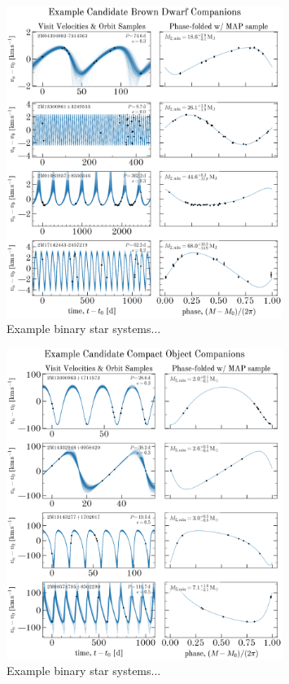 \documentclass[modern]{aastex63}
\begin{document}
\begin{figure}[!t]
    \begin{center}
    \includegraphics[width=0.8\textwidth]{example-brown-dwarfs-placeholder.png}
    \end{center}
    \caption{%
    Example binary star systems...
    \label{fig:brown-dwarfs}
    }
\end{figure}

\begin{figure}[!t]
    \begin{center}
    \includegraphics[width=0.8\textwidth]{example-compact-objects-placeholder.png}
    \end{center}
    \caption{%
    Example binary star systems...
    \label{fig:compact-objects}
    }
\end{figure}
\end{document}
